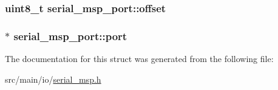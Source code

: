 \hypertarget{structserial__msp__port_abcaf0252d4e99c057cb85cc58c0d68b2}{
\subsubsection[{offset}]{\setlength{\rightskip}{0pt plus 5cm}uint8\+\_\+t serial\+\_\+msp\+\_\+port\+::offset}}\label{structserial__msp__port_abcaf0252d4e99c057cb85cc58c0d68b2}
\hypertarget{structserial__msp__port_a7dd310a82821a567bd264e6daababc23}{
\subsubsection[{port}]{$\ast$ serial\+\_\+msp\+\_\+port\+::port}}\label{structserial__msp__port_a7dd310a82821a567bd264e6daababc23}


The documentation for this struct was generated from the following file\+:\begin{DoxyCompactItemize}
\item 
src/main/io/\hyperlink{serial__msp_8h}{serial\+\_\+msp.\+h}\end{DoxyCompactItemize}
